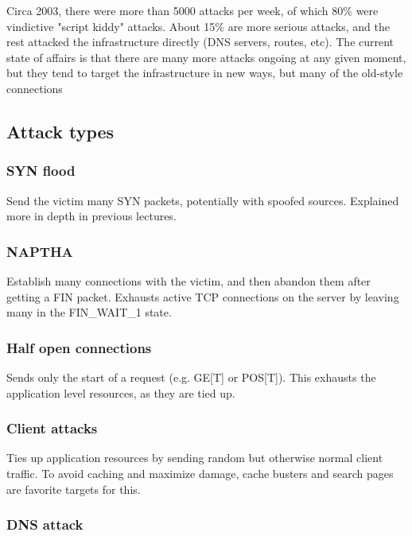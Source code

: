 \documentclass{idc_msc}
\begin{document}
Circa 2003, there were more than 5000 attacks per week, of which 80\% were vindictive "script kiddy" attacks.
About 15\% are more serious attacks, and the rest attacked the infrastructure directly (DNS servers, routes, etc).
The current state of affairs is that there are many more attacks ongoing at any given moment, but they tend to target the infrastructure in new ways, but many of the old-style connections 

\subsection{Attack types}

\subsubsection{SYN flood}

Send the victim many SYN packets, potentially with spoofed sources.
Explained more in depth in previous lectures.

\subsubsection{NAPTHA}

Establish many connections with the victim, and then abandon them after getting a FIN packet.
Exhausts active TCP connections on the server by leaving many in the FIN\_WAIT\_1 state.

\subsubsection{Half open connections}

Sends only the start of a request (e.g. GE[T] or POS[T]).
This exhausts the application level resources, as they are tied up.

\subsubsection{Client attacks}

Ties up application resources by sending random but otherwise normal client traffic.
To avoid caching and maximize damage, cache busters and search pages are favorite targets for this.

\subsubsection{DNS attack}
\end{document}
